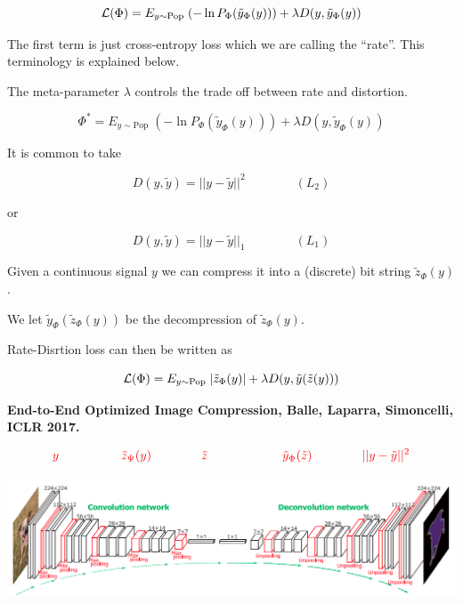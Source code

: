 {$${\cal L}(\Phi) = E_{y \sim \mathrm{Pop}}\;(- \ln P_\Phi(\tilde{y}_\Phi(y))) + \lambda D(y,\tilde{y}_\Phi(y))$$

\vfill
The first term is just cross-entropy loss which we are calling the ``rate''.  This terminology is explained below.

\vfill
The meta-parameter $\lambda$ controls the trade off between rate and distortion.



$$\Phi^* = E_{y \sim \mathrm{Pop}}\;(- \ln P_\Phi(\tilde{y}_\Phi(y))) + \lambda D(y,\tilde{y}_\Phi(y))$$

\vfill
It is common to take

$$D(y,\tilde{y}) = ||y-\tilde{y}||^2 \hspace{4em}(L_2)$$

\vfill
or

$$D(y,\tilde{y}) = ||y-\tilde{y}||_1 \hspace{4em} (L_1)$$


Given a continuous signal $y$ we can compress it into a (discrete) bit string $\tilde{z}_\Phi(y)$.

\vfill
We let $\tilde{y}_\Phi(\tilde{z}_\Phi(y))$ be the decompression of $\tilde{z}_\Phi(y)$.

\vfill
Rate-Disrtion loss can then be written as

$${\cal L}(\Phi) = E_{y \sim \mathrm{Pop}}\;|\tilde{z}_\Phi(y)| + \lambda D(y,\tilde{y}(\tilde{z}(y)))$$


{\bf End-to-End Optimized Image Compression, Balle, Laparra, Simoncelli, ICLR 2017.}


\vfill
$${\color{red}y \hspace{5em}  \tilde{z}_\Psi(y) \hspace{4em} \tilde{z} \hspace{6em} \tilde{y}_\Phi(\tilde{z}) \hspace{4em}||y - \tilde{y}||^2}$$
\centerline{\includegraphics[width=9in]{../images/Deconv}}

}
